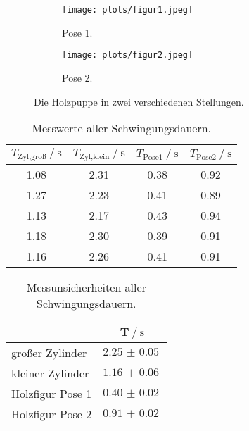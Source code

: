\begin{figure}
    \centering
    \begin{subfigure}{0.48\textwidth}
        \centering
        \texttt{[image: plots/figur1.jpeg]}
        \caption{Pose 1.}
        \label{fig:pos1}
    \end{subfigure}
    \begin{subfigure}{0.48\textwidth}
        \centering
        \texttt{[image: plots/figur2.jpeg]}
        \caption{Pose 2.}
        \label{fig:pos2}
    \end{subfigure}
    \caption{Die Holzpuppe in zwei verschiedenen Stellungen.}
    \label{fig:puppe}
\end{figure}

\begin{table}
    \centering
    \caption{Messwerte aller Schwingungsdauern.}
    \label{tab:messSchwing}
    \begin{tabular}{c c c c}
        \toprule
        {$T_\text{Zyl,groß}\:/\:\si{\second}$} & {$T_\text{Zyl,klein}\:/\:\si{\second}$} & {$T_\text{Pose1}\:/\:\si{\second}$} & {$T_\text{Pose2}\:/\:\si{\second}$} \\
        \midrule
        1.08 & 2.31 & 0.38 & 0.92 \\
        1.27 & 2.23 & 0.41 & 0.89 \\
        1.13 & 2.17 & 0.43 & 0.94 \\
        1.18 & 2.30 & 0.39 & 0.91 \\
        1.16 & 2.26 & 0.41 & 0.91 \\
        \bottomrule
    \end{tabular}
\end{table}

\begin{table}
    \centering
    \caption{Messunsicherheiten aller Schwingungsdauern.}
    \label{tab:mittelSchwing}
    \begin{tabular}{l c}
        \toprule
        & {T$\:/\:\si{\second}$} \\     %
        \midrule
        großer Zylinder  & $\SI{2.25(5)}{}$ \\
        kleiner Zylinder  & $\SI{1.16(6)}{}$ \\
        Holzfigur Pose 1  & $\SI{0.40(2)}{}$ \\
        Holzfigur Pose 2  & $\SI{0.91(2)}{}$ \\
        \bottomrule
    \end{tabular}
\end{table}

